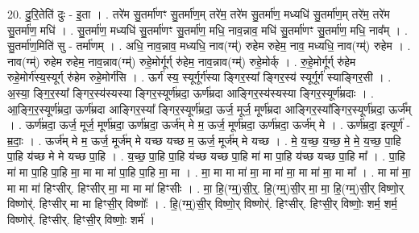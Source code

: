 \documentclass[17pt]{extarticle}
\begin{document}
20. दु॒रि॒तेति॑ दुः - इ॒ता । . तरे॑म सु॒तर्मा॑णꣳ सु॒तर्मा॑ण॒म् तरे॑म॒ तरे॑म सु॒तर्मा॑ण॒ मध्यधि॑ सु॒तर्मा॑ण॒म् तरे॑म॒ तरे॑म सु॒तर्मा॑ण॒ मधि॑ । . सु॒तर्मा॑ण॒ मध्यधि॑ सु॒तर्मा॑णꣳ सु॒तर्मा॑ण॒ मधि॒ नाव॒न्नाव॒ मधि॑ सु॒तर्मा॑णꣳ सु॒तर्मा॑ण॒ मधि॒ नाव᳚म् । . सु॒तर्मा॑ण॒मिति॑ सु - तर्मा॑णम् । . अधि॒ नाव॒न्नाव॒ मध्यधि॒ नाव(ग्म्॑) रुहेम रुहेम॒ नाव॒ मध्यधि॒ नाव(ग्म्॑) रुहेम । . नाव(ग्म्॑) रुहेम रुहेम॒ नाव॒न्नाव(ग्म्॑) रुहे॒मोर्गूर्ग् रु॑हेम॒ नाव॒न्नाव(ग्म्॑) रुहे॒मोर्क् । . रु॒हे॒मोर्गूर्ग् रु॑हेम रुहे॒मोर्ग॑स्य॒स्यूर्ग् रु॑हेम रुहे॒मोर्ग॑सि । . ऊर्ग॑ स्य॒ स्यूर्गूर्ग॑स्या ङ्गिर॒स्या᳚ ङ्गिर॒स्य॑ स्यूर्गूर्ग॑ स्याङ्गिर॒सी । . अ॒स्या॒ ङ्गि॒र॒स्या᳚ ङ्गिर॒स्य॑स्यस्या ङ्गिर॒स्यूर्ण॑म्रदा॒ ऊर्ण॑म्रदा आङ्गिर॒स्य॑स्यस्या ङ्गिर॒स्यूर्ण॑म्रदाः । . आ॒ङ्गि॒र॒स्यूर्ण॑म्रदा॒ ऊर्ण॑म्रदा आङ्गिर॒स्या᳚ ङ्गिर॒स्यूर्ण॑म्रदा॒ ऊर्ज॒ मूर्ज॒ मूर्ण॑म्रदा आङ्गिर॒स्या᳚ङ्गिर॒स्यूर्ण॑म्रदा॒ ऊर्ज᳚म् । . ऊर्ण॑म्रदा॒ ऊर्ज॒ मूर्ज॒ मूर्ण॑म्रदा॒ ऊर्ण॑म्रदा॒ ऊर्ज॑म् मे म॒ ऊर्ज॒ मूर्ण॑म्रदा॒ ऊर्ण॑म्रदा॒ ऊर्ज॑म् मे । . ऊर्ण॑म्रदा॒ इत्यूर्ण॑ - म्र॒दाः॒ । . ऊर्ज॑म् मे म॒ ऊर्ज॒ मूर्ज॑म् मे यच्छ यच्छ म॒ ऊर्ज॒ मूर्ज॑म् मे यच्छ । . मे॒ य॒च्छ॒ य॒च्छ॒ मे॒ मे॒ य॒च्छ॒ पा॒हि पा॒हि य॑च्छ मे मे यच्छ पा॒हि । . य॒च्छ॒ पा॒हि पा॒हि य॑च्छ यच्छ पा॒हि मा॑ मा पा॒हि य॑च्छ यच्छ पा॒हि मा᳚ । . पा॒हि मा॑ मा पा॒हि पा॒हि मा॒ मा मा मा॑ पा॒हि पा॒हि मा॒ मा । . मा॒ मा मा मा॑ मा॒ मा मा॑ मा॒ मा मा॑ मा॒ मा मा᳚ । . मा मा॑ मा॒ मा मा मा॑ हिꣳसीर्. हिꣳसीर् मा॒ मा मा मा॑ हिꣳसीः । . मा॒ हि॒(ग्म्॒)सी॒र्॒. हि॒(ग्म्॒)सी॒र् मा॒ मा॒ हि॒(ग्म्॒)सी॒र् विष्णो॒र् विष्णोर्॑. हिꣳसीर् मा मा हिꣳसी॒र् विष्णोः᳚ । . हि॒(ग्म्॒)सी॒र् विष्णो॒र् विष्णोर्॑. हिꣳसीर्. हिꣳसी॒र् विष्णोः॒ शर्म॒ शर्म॒ विष्णोर्॑. हिꣳसीर्. हिꣳसी॒र् विष्णोः॒ शर्म॑ । \newline
\end{document}
